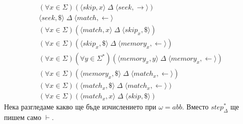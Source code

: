 \documentclass[14pt]{extarticle}
\begin{document}
\begin{align*}
    (\forall x \in \Sigma)(\langle skip, x \rangle \;\Delta\; \langle seek, \rightarrow \rangle) \\
    \langle seek, \$ \rangle \;\Delta\; \langle match, \leftarrow \rangle \\
    (\forall x \in \Sigma)(\langle match, x \rangle \;\Delta\; \langle skip_x, \$\rangle) \\
    (\forall x \in \Sigma)(\langle skip_x, \$ \rangle \;\Delta\; \langle memory_x, \leftarrow \rangle) \\
    (\forall x \in \Sigma)(\forall y \in \Sigma^*)(\langle memory_x, y \rangle \;\Delta\; \langle memory_x, \leftarrow \rangle) \\
    (\forall x \in \Sigma)(\langle memory_x, \$ \rangle \;\Delta\; \langle match_x, \leftarrow \rangle) \\
    (\forall x \in \Sigma)(\langle match_x, \$ \rangle \;\Delta\; \langle match_x, \leftarrow \rangle) \\
    (\forall x \in \Sigma)(\langle match_x, x \rangle \;\Delta\; \langle skip, \$ \rangle)
\end{align*}
Нека разгледаме какво ще бъде изчислението при \(\omega = abb\).
Вместо \(step_\Delta^*\) ще пишем само \(\vdash\).
\end{document}
